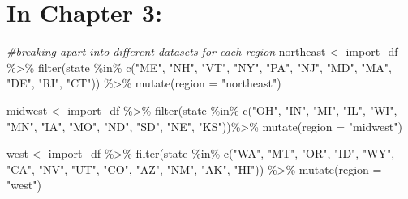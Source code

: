 \documentclass[12pt, twoside]{amherstthesis}
\newenvironment{Shaded}{\begin{snugshade}}{\end{snugshade}}
\newcommand{\AttributeTok}[1]{\textcolor[rgb]{0.77,0.63,0.00}{#1}}
\newcommand{\CommentTok}[1]{\textcolor[rgb]{0.56,0.35,0.01}{\textit{#1}}}
\newcommand{\FunctionTok}[1]{\textcolor[rgb]{0.00,0.00,0.00}{#1}}
\newcommand{\NormalTok}[1]{#1}
\newcommand{\OtherTok}[1]{\textcolor[rgb]{0.56,0.35,0.01}{#1}}
\newcommand{\SpecialCharTok}[1]{\textcolor[rgb]{0.00,0.00,0.00}{#1}}
\newcommand{\StringTok}[1]{\textcolor[rgb]{0.31,0.60,0.02}{#1}}
\begin{document}
\hypertarget{in-chapter-3}{%
\section{In Chapter 3:}\label{in-chapter-3}}
\begin{Shaded}
\begin{Highlighting}[]
\CommentTok{\#breaking apart into different datasets for each region}
\NormalTok{northeast }\OtherTok{\textless{}{-}}\NormalTok{ import\_df }\SpecialCharTok{\%\textgreater{}\%}
  \FunctionTok{filter}\NormalTok{(state }\SpecialCharTok{\%in\%} \FunctionTok{c}\NormalTok{(}\StringTok{"ME"}\NormalTok{, }\StringTok{"NH"}\NormalTok{, }\StringTok{"VT"}\NormalTok{, }\StringTok{"NY"}\NormalTok{, }\StringTok{"PA"}\NormalTok{, }\StringTok{"NJ"}\NormalTok{, }\StringTok{"MD"}\NormalTok{, }
                      \StringTok{"MA"}\NormalTok{, }\StringTok{"DE"}\NormalTok{, }\StringTok{"RI"}\NormalTok{, }\StringTok{"CT"}\NormalTok{)) }\SpecialCharTok{\%\textgreater{}\%}
  \FunctionTok{mutate}\NormalTok{(}\AttributeTok{region =} \StringTok{"northeast"}\NormalTok{)}

\NormalTok{midwest }\OtherTok{\textless{}{-}}\NormalTok{ import\_df }\SpecialCharTok{\%\textgreater{}\%}
  \FunctionTok{filter}\NormalTok{(state }\SpecialCharTok{\%in\%} \FunctionTok{c}\NormalTok{(}\StringTok{"OH"}\NormalTok{, }\StringTok{"IN"}\NormalTok{, }\StringTok{"MI"}\NormalTok{, }\StringTok{"IL"}\NormalTok{, }\StringTok{"WI"}\NormalTok{, }\StringTok{"MN"}\NormalTok{, }\StringTok{"IA"}\NormalTok{, }
                      \StringTok{"MO"}\NormalTok{, }\StringTok{"ND"}\NormalTok{, }\StringTok{"SD"}\NormalTok{, }\StringTok{"NE"}\NormalTok{, }\StringTok{"KS"}\NormalTok{))}\SpecialCharTok{\%\textgreater{}\%}
  \FunctionTok{mutate}\NormalTok{(}\AttributeTok{region =} \StringTok{"midwest"}\NormalTok{)}

\NormalTok{west }\OtherTok{\textless{}{-}}\NormalTok{ import\_df }\SpecialCharTok{\%\textgreater{}\%}
  \FunctionTok{filter}\NormalTok{(state }\SpecialCharTok{\%in\%} \FunctionTok{c}\NormalTok{(}\StringTok{"WA"}\NormalTok{, }\StringTok{"MT"}\NormalTok{, }\StringTok{"OR"}\NormalTok{, }\StringTok{"ID"}\NormalTok{, }\StringTok{"WY"}\NormalTok{, }\StringTok{"CA"}\NormalTok{, }\StringTok{"NV"}\NormalTok{, }
                      \StringTok{"UT"}\NormalTok{, }\StringTok{"CO"}\NormalTok{, }\StringTok{"AZ"}\NormalTok{, }\StringTok{"NM"}\NormalTok{, }\StringTok{"AK"}\NormalTok{, }\StringTok{"HI"}\NormalTok{)) }\SpecialCharTok{\%\textgreater{}\%}
  \FunctionTok{mutate}\NormalTok{(}\AttributeTok{region =} \StringTok{"west"}\NormalTok{)}


\end{Highlighting}
\end{Shaded}
\end{document}
